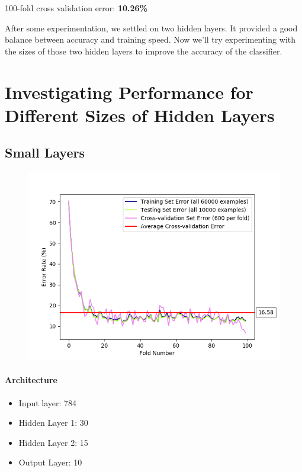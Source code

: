 \documentclass[11pt]{article}
\makeatletter
\def\maxwidth{\ifdim\Gin@nat@width>\linewidth\linewidth
    \else\Gin@nat@width\fi}
\let\Oldincludegraphics\includegraphics
\renewcommand{\includegraphics}[1]{\Oldincludegraphics[width=.8\maxwidth]{#1}}
\providecommand{\tightlist}{%
      \setlength{\itemsep}{0pt}\setlength{\parskip}{0pt}}
\makeatother
\begin{document}
100-fold cross validation error: \textbf{10.26\%}

After some experimentation, we settled on two hidden layers. It provided
a good balance between accuracy and training speed. Now we'll try
experimenting with the sizes of those two hidden layers to improve the
accuracy of the classifier.

\pagebreak

    \section{Investigating Performance for Different Sizes of Hidden
Layers}\label{investigating-performance-for-different-sizes-of-hidden-layers}

\subsection{Small Layers}\label{small-layers}

\begin{figure}[htbp]
\centering
\includegraphics{plots/ff-layersize-30-15.png}
\end{figure}

\paragraph{Architecture}\label{architecture}

\begin{itemize}
\tightlist
\item
  Input layer: 784
\item
  Hidden Layer 1: 30
\item
  Hidden Layer 2: 15
\item
  Output Layer: 10
\end{itemize}
\end{document}
